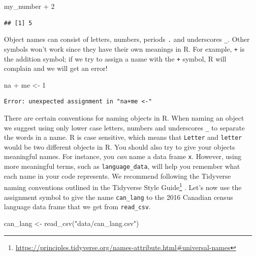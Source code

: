 \documentclass[
  12pt,
]{krantz}
\newenvironment{Shaded}{\begin{snugshade}}{\end{snugshade}}
\newcommand{\DecValTok}[1]{\textcolor[rgb]{0.06,0.06,0.06}{#1}}
\newcommand{\FunctionTok}[1]{\textcolor[rgb]{0,0,0}{#1}}
\newcommand{\NormalTok}[1]{#1}
\newcommand{\OtherTok}[1]{\textcolor[rgb]{0.37,0.37,0.37}{#1}}
\newcommand{\SpecialCharTok}[1]{\textcolor[rgb]{0,0,0}{#1}}
\newcommand{\StringTok}[1]{\textcolor[rgb]{0.5,0.5,0.5}{#1}}
\renewcommand{\href}[2]{#2\footnote{\url{#1}}}
\begin{document}
\begin{Shaded}
\begin{Highlighting}[]
\NormalTok{my\_number }\SpecialCharTok{+} \DecValTok{2}
\end{Highlighting}
\end{Shaded}

\begin{verbatim}
## [1] 5
\end{verbatim}

Object names  can consist of letters, numbers, periods \texttt{.} and underscores \texttt{\_}.
Other symbols won't work since they have their own meanings in R. For example,
\texttt{+} is the addition symbol; if we try to assign a name with
the \texttt{+} symbol, R will complain and we will get an error!

\begin{Shaded}
\begin{Highlighting}[]
\NormalTok{na }\SpecialCharTok{+}\NormalTok{ me }\OtherTok{\textless{}{-}} \DecValTok{1}
\end{Highlighting}
\end{Shaded}

\begin{verbatim}
Error: unexpected assignment in "na+me <-"
\end{verbatim}

There are certain conventions for naming objects in R. When naming  an object we
suggest using only lower case letters, numbers and underscores \texttt{\_} to separate
the words in a name. R is case sensitive, which means that \texttt{Letter} and
\texttt{letter} would be two different objects in R. You should also try to give your
objects meaningful names. For instance, you \emph{can} name a data frame \texttt{x}.
However, using more meaningful terms, such as \texttt{language\_data}, will help you
remember what each name in your code represents. We recommend following the
Tidyverse naming conventions outlined in the \href{https://principles.tidyverse.org/names-attribute.html\#universal-names}{Tidyverse Style
Guide}
\citep{tidyversestyleguide}. Let's now use the assignment symbol to give the name
\texttt{can\_lang} to the 2016 Canadian census language data frame that we get from
\texttt{read\_csv}.

\begin{Shaded}
\begin{Highlighting}[]
\NormalTok{can\_lang }\OtherTok{\textless{}{-}} \FunctionTok{read\_csv}\NormalTok{(}\StringTok{"data/can\_lang.csv"}\NormalTok{)}
\end{Highlighting}
\end{Shaded}
\end{document}

